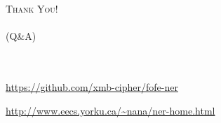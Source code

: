 \documentclass{beamer}
\begin{document}
\appendix

\begin{frame}
\begin{center}
{\huge \textsc{Thank You!}}\\
\ \\
{\huge \textsc{(Q\&A)}}
\ \\
\ \\
\ \\
\begin{description}
	\small
	\item[code] \url{https://github.com/xmb-cipher/fofe-ner}
	\item[demo] \url{http://www.eecs.yorku.ca/~nana/ner-home.html}
\end{description}
\end{center}
\end{frame}

\begin{frame}
\printbibliography[heading=none]
\end{frame}
\end{document}
